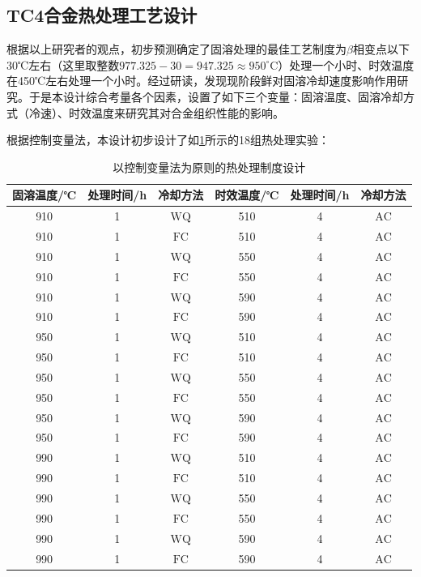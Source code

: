 \subsection{TC4合金热处理工艺设计}

根据以上研究者的观点，初步预测确定了固溶处理的最佳工艺制度为$ \beta $相变点以下30℃左右（这里取整数$ 977.325-30=947.325\approx950^{\circ} \mathrm{C} $）处理一个小时、时效温度在450℃左右处理一个小时。经过研读，发现现阶段鲜对固溶冷却速度影响作用研究。于是本设计综合考量各个因素，设置了如下三个变量：固溶温度、固溶冷却方式（冷速）、时效温度来研究其对合金组织性能的影响。

根据控制变量法，本设计初步设计了如\ref{sec:first}所示的18组热处理实验：
\begin{table}[htbp]
	\centering
	\caption{以控制变量法为原则的热处理制度设计}
	\label{sec:first}
	\begin{tabular}{cccccc}
		\toprule
		固溶温度/℃ &处理时间/h & 冷却方法 & 时效温度/℃  &处理时间/h & 冷却方法 \\
		\midrule
		910 & 1 & $\mathrm{WQ}$ & 510 & 4 & $\mathrm{AC}$\\
		910 & 1 & $\mathrm{FC}$  & 510 & 4 & $\mathrm{AC}$ \\
		910 & 1 & $\mathrm{WQ}$ & 550 & 4 & $\mathrm{AC}$ \\
		910 & 1 & $\mathrm{FC}$  & 550 & 4 & $\mathrm{AC}$ \\
		910 & 1 & $\mathrm{WQ}$ & 590 & 4 & $\mathrm{AC}$ \\
		910 & 1 & $\mathrm{FC}$  & 590 & 4 & $\mathrm{AC}$ \\
		\midrule
		950 & 1 & $\mathrm{WQ}$ & 510 & 4 & $\mathrm{AC}$ \\
		950 & 1 & $\mathrm{FC}$ & 510 & 4 & $\mathrm{AC}$ \\
		950 & 1 & $\mathrm{WQ}$ & 550 & 4 & $\mathrm{AC}$ \\
		950 & 1 & $\mathrm{FC}$ & 550 & 4 & $\mathrm{AC}$ \\
		950 & 1 & $\mathrm{WQ}$ & 590 & 4 & $\mathrm{AC}$ \\
		950 & 1 & $\mathrm{FC}$ & 590 & 4 & $\mathrm{AC}$ \\
		\midrule
		990 & 1 & $\mathrm{WQ}$ & 510 & 4 & $\mathrm{AC}$ \\
		990 & 1 & $\mathrm{FC}$ & 510 & 4 & $\mathrm{AC}$ \\
		990 & 1 & $\mathrm{WQ}$ & 550 & 4 & $\mathrm{AC}$ \\
		990 & 1 & $\mathrm{FC}$ & 550 & 4 & $\mathrm{AC}$ \\
		990 & 1 & $\mathrm{WQ}$ & 590 & 4 & $\mathrm{AC}$ \\
		990 & 1 & $\mathrm{FC}$ & 590 & 4 & $\mathrm{AC}$ \\
		\bottomrule
	\end{tabular}
\end{table}

